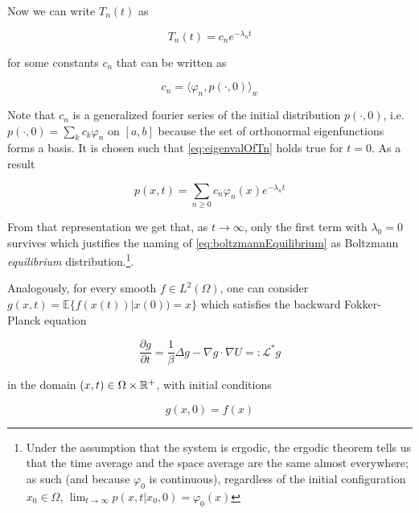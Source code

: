 Now we can write $T_n(t)$ as

\begin{equation}\label{eq:eigenvalOfTn}
T_n(t) = c_n e^{-\lambda_n t}
\end{equation}

for some constants $c_n$ that can be written as

\begin{equation*}
c_n = \langle \varphi_n, p(\cdot, 0) \rangle_w
\end{equation*}

Note that $c_n$ is a generalized fourier series of the initial distribution $p(\cdot, 0)$, i.e. $p(\cdot, 0) = \sum_k c_k \varphi_n$ on $[a,b]$ because the set of orthonormal eigenfunctions forms a basis. It is chosen such that \eqref{eq:eigenvalOfTn} holds true for $t=0$. As a result

\begin{equation}\label{eq:decompositionProbDistributionfFPO}
p(x,t) = \sum_{n\geq 0} c_n \varphi_n(x) e^{-\lambda_n t}
\end{equation}

From that representation we get that, as $t\rightarrow \infty$, only the first term with $\lambda_0 = 0$ survives which justifies the naming of \eqref{eq:boltzmannEquilibrium} as Boltzmann \textit{equilibrium} distribution.\footnote{Under the assumption that the system is ergodic, the ergodic theorem tells us that the time average and the space average are the same almost everywhere; as such (and because $\varphi_0$ is continuous), regardless of the initial configuration $x_0\in\Omega$, $\lim_{t\rightarrow\infty} p(x,t | x_0, 0) = \varphi_0(x)$}.

Analogously, for every smooth $f\in L^2(\Omega)$, one can consider $g(x,t) = \mathbb{E}\{f(x(t)) | x(0) ) = x \}$ which satisfies the backward Fokker-Planck equation

\begin{equation*}
\frac{\partial g}{\partial t} = \frac{1}{\beta}\Delta g - \nabla g \cdot\nabla U =: \mathcal{L}^*g
\end{equation*}

in the domain $(x,t)\in \Omega\times\mathbb{R}^+$, with initial conditions

\begin{equation*}
g(x,0)=f(x)
\end{equation*}

